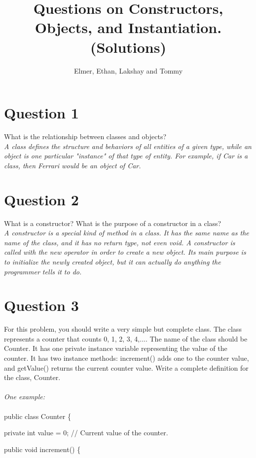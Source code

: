 \documentclass[11pt, oneside]{article}   	%
\title{Questions on Constructors, Objects, and Instantiation. (Solutions)}
\author{Elmer, Ethan, Lakshay and Tommy}
\date{}							%
\begin{document}
\maketitle
\section*{Question 1}
What is the relationship between classes and objects?\\

	\textit{A class defines the structure and behaviors of all entities of a given type, while an object is one particular "instance" of that type of entity. For example, if Car is a class, then Ferrari would be an object of Car.}
\section*{Question 2}
What is a constructor? What is the purpose of a constructor in a class?\\

	\textit{A constructor is a special kind of method in a class. It has the same name as the name of the class, and it has no return type, not even void. A constructor is called with the new operator in order to create a new object. Its main purpose is to initialize the newly created object, but it can actually do anything the programmer tells it to do.}

\section*{Question 3}
For this problem, you should write a very simple but complete class. The class represents a counter that counts 0, 1, 2, 3, 4,.... The name of the class should be Counter. It has one private instance variable representing the value of the counter. It has two instance methods: increment() adds one to the counter value, and getValue() returns the current counter value. Write a complete definition for the class, Counter.\\\\

 \textit{One example:}\\\\
	
		public class Counter \{
	
	           \hspace{4ex} private int value = 0;  // Current value of the counter.
	
	           \hspace{4ex} public void increment() \{ 
	            
\end{document}
